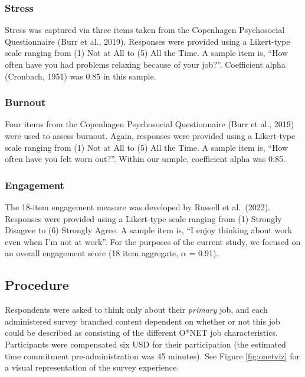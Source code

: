 \documentclass[
  man]{apa7}
\begin{document}
\subsubsection{Stress}\label{stress}

Stress was captured via three items taken from the Copenhagen Psychosocial Questionnaire (Burr et al., 2019). Responses were provided using a Likert-type scale ranging from (1) Not at All to (5) All the Time. A sample item is, ``How often have you had problems relaxing because of your job?''. Coefficient alpha (Cronbach, 1951) was 0.85 in this sample.

\subsubsection{Burnout}\label{burnout}

Four items from the Copenhagen Psychosocial Questionnaire (Burr et al., 2019) were used to assess burnout. Again, responses were provided using a Likert-type scale ranging from (1) Not at All to (5) All the Time. A sample item is, ``How often have you felt worn out?''. Within our sample, coefficient alpha was 0.85.

\subsubsection{Engagement}\label{engagement}

The 18-item engagement measure was developed by Russell et al.~(2022). Responses were provided using a Likert-type scale ranging from (1) Strongly Disagree to (6) Strongly Agree. A sample item is, ``I enjoy thinking about work even when I'm not at work''. For the purposes of the current study, we focused on an overall engagement score (18 item aggregate, \(\alpha\) = 0.91).

\subsection{Procedure}\label{procedure}

Respondents were asked to think only about their \emph{primary} job, and each administered survey branched content dependent on whether or not this job could be described as consisting of the different O*NET job characteristics. Participants were compensated six USD for their participation (the estimated time commitment pre-administration was 45 minutes). See Figure \ref{fig:onetviz} for a visual representation of the survey experience.
\end{document}
